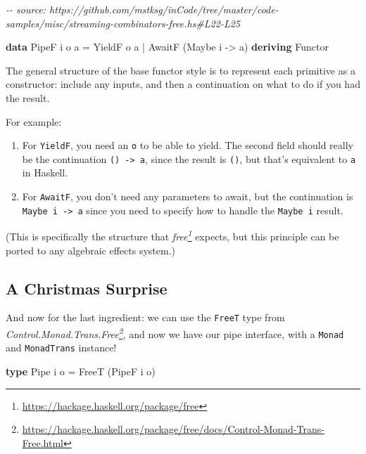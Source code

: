 \documentclass[]{article}
\newenvironment{Shaded}{}{}
\newcommand{\CommentTok}[1]{\textcolor[rgb]{0.38,0.63,0.69}{\textit{#1}}}
\newcommand{\DataTypeTok}[1]{\textcolor[rgb]{0.56,0.13,0.00}{#1}}
\newcommand{\KeywordTok}[1]{\textcolor[rgb]{0.00,0.44,0.13}{\textbf{#1}}}
\newcommand{\NormalTok}[1]{#1}
\newcommand{\OperatorTok}[1]{\textcolor[rgb]{0.40,0.40,0.40}{#1}}
\newcommand{\OtherTok}[1]{\textcolor[rgb]{0.00,0.44,0.13}{#1}}
\renewcommand{\href}[2]{#2\footnote{\url{#1}}}
\begin{document}
\begin{Shaded}
\begin{Highlighting}[]
\CommentTok{{-}{-} source: https://github.com/mstksg/inCode/tree/master/code{-}samples/misc/streaming{-}combinators{-}free.hs\#L22{-}L25}

\KeywordTok{data} \DataTypeTok{PipeF}\NormalTok{ i o a }\OtherTok{=}
    \DataTypeTok{YieldF}\NormalTok{ o a}
  \OperatorTok{|} \DataTypeTok{AwaitF}\NormalTok{ (}\DataTypeTok{Maybe}\NormalTok{ i }\OtherTok{{-}\textgreater{}}\NormalTok{ a)}
    \KeywordTok{deriving} \DataTypeTok{Functor}
\end{Highlighting}
\end{Shaded}

The general structure of the base functor style is to represent each primitive
as a constructor: include any inputs, and then a continuation on what to do if
you had the result.

For example:

\begin{enumerate}
\def\labelenumi{\arabic{enumi}.}
\tightlist
\item
  For \texttt{YieldF}, you need an \texttt{o} to be able to yield. The second
  field should really be the continuation \texttt{()\ -\textgreater{}\ a}, since
  the result is \texttt{()}, but that's equivalent to \texttt{a} in Haskell.
\item
  For \texttt{AwaitF}, you don't need any parameters to await, but the
  continuation is \texttt{Maybe\ i\ -\textgreater{}\ a} since you need to
  specify how to handle the \texttt{Maybe\ i} result.
\end{enumerate}

(This is specifically the structure that
\emph{\href{https://hackage.haskell.org/package/free}{free}} expects, but this
principle can be ported to any algebraic effects system.)

\subsection{A Christmas Surprise}\label{a-christmas-surprise}

And now for the last ingredient: we can use the \texttt{FreeT} type from
\emph{\href{https://hackage.haskell.org/package/free/docs/Control-Monad-Trans-Free.html}{Control.Monad.Trans.Free}},
and now we have our pipe interface, with a \texttt{Monad} and
\texttt{MonadTrans} instance!

\begin{Shaded}
\begin{Highlighting}[]
\KeywordTok{type} \DataTypeTok{Pipe}\NormalTok{ i o }\OtherTok{=} \DataTypeTok{FreeT}\NormalTok{ (}\DataTypeTok{PipeF}\NormalTok{ i o)}
\end{Highlighting}
\end{Shaded}
\end{document}
